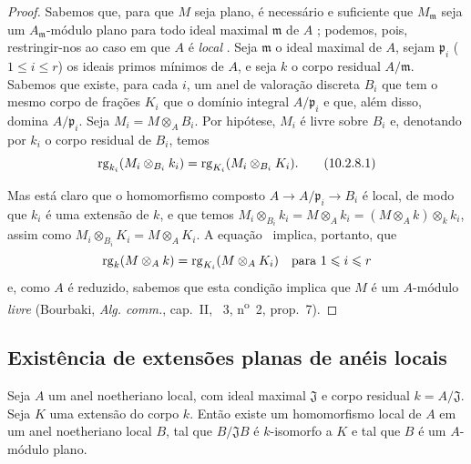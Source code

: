 \begin{proof}
Sabemos que, para que $M$ seja plano, é necessário e suficiente que $M_\mathfrak{m}$ seja um $A_\mathfrak{m}$-módulo plano para todo ideal maximal $\mathfrak{m}$ de $A$ ;
podemos, pois, restringir-nos ao caso em que $A$ é \emph{local} .
Seja $\mathfrak{m}$ o ideal maximal de $A$, sejam $\mathfrak{p}_i$ ($1\leq i\leq r$) os ideais primos mínimos de $A$, e seja $k$ o corpo residual $A/\mathfrak{m}$.
Sabemos  que existe, para cada $i$, um anel de valoração discreta $B_i$ que tem o mesmo corpo de frações $K_i$ que o domínio integral $A/\mathfrak{p}_i$ e que, além disso, domina $A/\mathfrak{p}_i$.
Seja $M_i=M\otimes_A B_i$.
Por hipótese, $M_i$ é livre sobre $B_i$ e, denotando por $k_i$ o corpo residual de $B_i$, temos
\[
\label{0.10.2.8.1}
  \rg_{k_i}(M_i\otimes_{B_i}k_i)=\rg_{K_i}(M_i\otimes_{B_i}K_i).
  \tag{10.2.8.1}
\]

Mas está claro que o homomorfismo composto $A\to A/\mathfrak{p}_i\to B_i$ é local, de modo que $k_i$ é uma extensão de $k$, e que temos $M_i\otimes_{B_i}k_i = M\otimes_A k_i = (M\otimes_A k)\otimes_k k_i$, assim como $M_i\otimes_{B_i}K_i = M\otimes_A K_i$.
A equação~ implica, portanto, que
\[
  \operatorname{rg}_k(M\otimes_A k)=\operatorname{rg}_{K_i}(M\otimes_A K_i)\quad\mbox{para $1\leqslant i\leqslant r$}
\]
e, como $A$ é reduzido, sabemos que esta condição implica que $M$ é um $A$-módulo \emph{livre} (Bourbaki, \emph{Alg. comm.}, cap.~II, \textsection~3, n\textsuperscript{o}~2, prop.~7).
\end{proof}

\subsection{Existência de extensões planas de anéis locais}
\label{subsection:0.10.3}

\begin{proposition}[10.3.1]
\label{0.10.3.1}
Seja $A$ um anel noetheriano local, com ideal maximal $\mathfrak{J}$ e corpo residual $k=A/\mathfrak{J}$.
Seja $K$ uma extensão do corpo $k$.
Então existe um homomorfismo local de $A$ em um anel noetheriano local $B$, tal que $B/\mathfrak{J}B$ é $k$-isomorfo a $K$ e tal que $B$ é um $A$-módulo plano.
\end{proposition}

